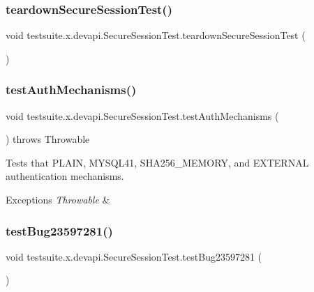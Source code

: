 \subsubsection{\texorpdfstring{teardown\+Secure\+Session\+Test()}{teardownSecureSessionTest()}}
{\footnotesize\ttfamily void testsuite.\+x.\+devapi.\+Secure\+Session\+Test.\+teardown\+Secure\+Session\+Test (\begin{DoxyParamCaption}{ }\end{DoxyParamCaption})}

\mbox{\label{classtestsuite_1_1x_1_1devapi_1_1_secure_session_test_a8d3f3c54a0170233b5c1fc60dc14e163}} 
\subsubsection{\texorpdfstring{test\+Auth\+Mechanisms()}{testAuthMechanisms()}}
{\footnotesize\ttfamily void testsuite.\+x.\+devapi.\+Secure\+Session\+Test.\+test\+Auth\+Mechanisms (\begin{DoxyParamCaption}{ }\end{DoxyParamCaption}) throws Throwable}

Tests that P\+L\+A\+IN, M\+Y\+S\+Q\+L41, S\+H\+A256\+\_\+\+M\+E\+M\+O\+RY, and E\+X\+T\+E\+R\+N\+AL authentication mechanisms.


\begin{DoxyExceptions}{Exceptions}
{\em Throwable} & \\
\hline
\end{DoxyExceptions}
\mbox{\label{classtestsuite_1_1x_1_1devapi_1_1_secure_session_test_a30cc42accb4ad16995c0dd39d7e78c3b}} 
\subsubsection{\texorpdfstring{test\+Bug23597281()}{testBug23597281()}}
{\footnotesize\ttfamily void testsuite.\+x.\+devapi.\+Secure\+Session\+Test.\+test\+Bug23597281 (\begin{DoxyParamCaption}{ }\end{DoxyParamCaption})}

